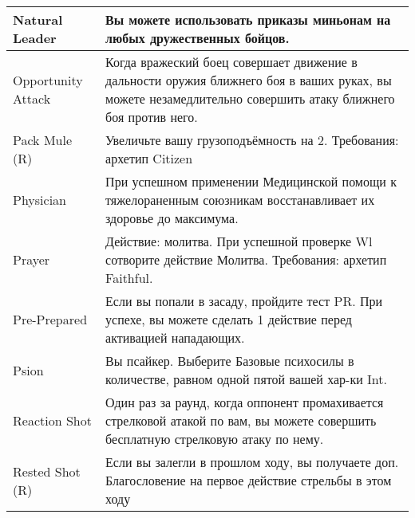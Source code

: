 \begin{table}[h]
\begin{tabularx}{\textwidth}{|l|X|}
        Natural Leader     & Вы можете использовать приказы миньонам на любых дружественных бойцов.                                                                                                                                                             \\ \hline
        Opportunity Attack & Когда вражеский боец совершает движение в дальности оружия ближнего боя в ваших руках, вы можете незамедлительно совершить атаку ближнего боя против него.                                                                         \\ \hline
        Pack Mule (R)      & Увеличьте вашу грузоподъёмность на 2. Требования: архетип Citizen                                                                                                                                                                  \\ \hline
        Physician          & При успешном применении Медицинской помощи к тяжелораненным союзникам восстанавливает их здоровье до максимума.                                                                                                                    \\ \hline
        Prayer             & Действие: молитва. При успешной проверке Wl сотворите действие Молитва. Требования: архетип Faithful.                                                                                                                              \\ \hline
        Pre-Prepared       & Если вы попали в засаду, пройдите тест PR. При успехе, вы можете сделать 1 действие перед активацией нападающих.                                                                                                                   \\ \hline
        Psion              & Вы псайкер. Выберите Базовые психосилы в количестве, равном одной пятой вашей хар-ки Int.                                                                                                                                          \\ \hline
        Reaction Shot      & Один раз за раунд, когда оппонент промахивается стрелковой атакой по вам, вы можете совершить бесплатную стрелковую атаку по нему.                                                                                                 \\ \hline
        Rested Shot (R)    & Если вы залегли в прошлом ходу, вы получаете доп. Благословение на первое действие стрельбы в этом ходу                                                                                                                            \\ \hline

\end{tabularx}
\end{table}
